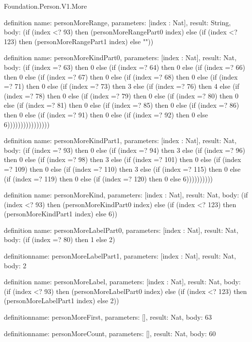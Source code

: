 \begin{lexlean}{Foundation.Person.V1.More}
\begin{semanticmodule}
definition{
  name: personMoreRange,
  parameters: [index : Nat],
  result: String,
  body: (if (index <? 93) then (personMoreRangePart0 index) else (if (index <? 123) then (personMoreRangePart1 index) else ""))
}

definition{
  name: personMoreKindPart0,
  parameters: [index : Nat],
  result: Nat,
  body: (if (index =? 63) then 0 else (if (index =? 64) then 0 else (if (index =? 66) then 0 else (if (index =? 67) then 0 else (if (index =? 68) then 0 else (if (index =? 71) then 0 else (if (index =? 73) then 3 else (if (index =? 76) then 4 else (if (index =? 78) then 0 else (if (index =? 79) then 0 else (if (index =? 80) then 0 else (if (index =? 81) then 0 else (if (index =? 85) then 0 else (if (index =? 86) then 0 else (if (index =? 91) then 0 else (if (index =? 92) then 0 else 6))))))))))))))))
}

definition{
  name: personMoreKindPart1,
  parameters: [index : Nat],
  result: Nat,
  body: (if (index =? 93) then 0 else (if (index =? 94) then 3 else (if (index =? 96) then 0 else (if (index =? 98) then 3 else (if (index =? 101) then 0 else (if (index =? 109) then 0 else (if (index =? 110) then 3 else (if (index =? 115) then 0 else (if (index =? 119) then 0 else (if (index =? 120) then 0 else 6))))))))))
}

definition{
  name: personMoreKind,
  parameters: [index : Nat],
  result: Nat,
  body: (if (index <? 93) then (personMoreKindPart0 index) else (if (index <? 123) then (personMoreKindPart1 index) else 6))
}

definition{
  name: personMoreLabelPart0,
  parameters: [index : Nat],
  result: Nat,
  body: (if (index =? 80) then 1 else 2)
}

definition{name: personMoreLabelPart1, parameters: [index : Nat], result: Nat, body: 2}

definition{
  name: personMoreLabel,
  parameters: [index : Nat],
  result: Nat,
  body: (if (index <? 93) then (personMoreLabelPart0 index) else (if (index <? 123) then (personMoreLabelPart1 index) else 2))
}

definition{name: personMoreFirst, parameters: [], result: Nat, body: 63}

definition{name: personMoreCount, parameters: [], result: Nat, body: 60}
\end{semanticmodule}
\end{lexlean}
